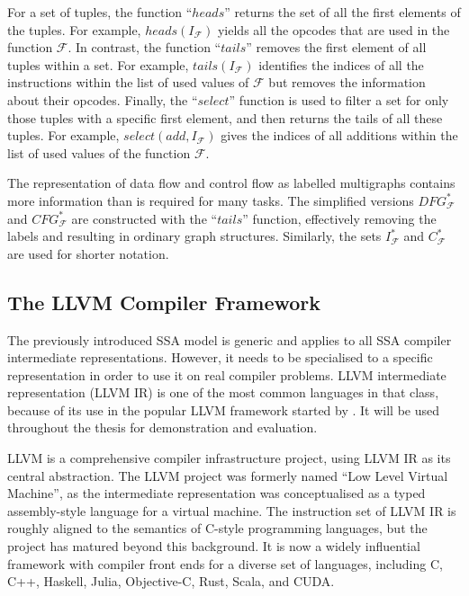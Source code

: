     For a set of tuples, the function ``$heads$'' returns the set of all the
    first elements of the tuples.
    For example, $heads(I_\mathcal F)$ yields all the opcodes that are used in
    the function $\mathcal F$.
    In contrast, the function ``$tails$'' removes the first element of all
    tuples within a set.
    For example, $tails(I_\mathcal F)$ identifies the indices of all the
    instructions within the list of used values of $\mathcal F$ but removes the
    information about their opcodes.
    Finally, the ``$select$'' function is used to filter a set for only those
    tuples with a specific first element, and then returns the tails of all
    these tuples.
    For example, $select(add,I_\mathcal F)$ gives the indices of all additions
    within the list of used values of the function $\mathcal F$.

    The representation of data flow and control flow as labelled multigraphs
    contains more information than is required for many tasks.
    The simplified versions $DFG_\mathcal F^*$ and $CFG_\mathcal F^*$ are
    constructed with the ``$tails$'' function, effectively removing the labels
    and resulting in ordinary graph structures.
    Similarly, the sets $I_\mathcal F^*$ and $C_\mathcal F^*$ are used for
    shorter notation.

\subsection{The LLVM Compiler Framework}

    The previously introduced SSA model is generic and applies to all SSA
    compiler intermediate representations.
    However, it needs to be specialised to a specific representation in
    order to use it on real compiler problems.
    LLVM intermediate representation (LLVM IR) is one of the most common
    languages in that class, because of its use in the popular LLVM
    framework started by \citet{lattner2004llvm}.
    It will be used throughout the thesis for demonstration and evaluation.

    LLVM is a comprehensive compiler infrastructure project, using LLVM IR as
    its central abstraction.
    The LLVM project was formerly named ``Low Level Virtual Machine'', as the
    intermediate representation was conceptualised as a typed assembly-style
    language for a virtual machine.
    The instruction set of LLVM IR is roughly aligned to the semantics of
    C-style programming languages, but the project has matured beyond this
    background.
    It is now a widely influential framework with compiler front ends
    for a diverse set of languages, including C, C++, Haskell, Julia,
    Objective-C, Rust, Scala, and CUDA.

